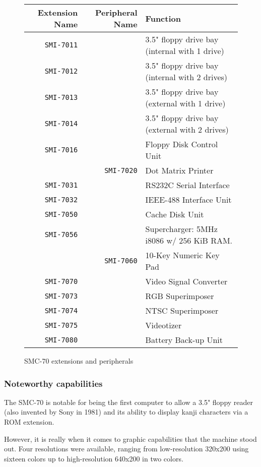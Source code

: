 \begin{figure}[H]

\begin{tabularx}{\textwidth}{rrX} 
  \toprule 
  \textbf{Extension Name} & \textbf{Peripheral Name} & \textbf{Function} \\               
  \toprule    
\texttt{SMI-7011} & & 3.5" floppy drive bay (internal with 1 drive)\\ 
\texttt{SMI-7012} & & 3.5" floppy drive bay (internal with 2 drives)\\ 
\texttt{SMI-7013} & & 3.5" floppy drive bay (external with 1 drive)\\ 
\texttt{SMI-7014} & & 3.5" floppy drive bay (external with 2 drives)\\ 
\texttt{SMI-7016} & & Floppy Disk Control Unit\\ 
 & \texttt{SMI-7020} & Dot Matrix Printer\\ 
\texttt{SMI-7031} & & RS232C Serial Interface\\ 
\texttt{SMI-7032} & & IEEE-488 Interface Unit\\ 
\texttt{SMI-7050} & & Cache Disk Unit\\ 
\texttt{SMI-7056} & & Supercharger: 5MHz i8086 w/ 256 KiB RAM.\\ 
 & \texttt{SMI-7060} & 10-Key Numeric Key Pad\\ 
\texttt{SMI-7070} & & Video Signal Converter\\ 
\texttt{SMI-7073} & & RGB Superimposer\\ 
\texttt{SMI-7074} & & NTSC Superimposer\\ 
\texttt{SMI-7075} & & Videotizer\\ 
\texttt{SMI-7080} & & Battery Back-up Unit\\ 
\toprule
\end{tabularx}%
\caption*{SMC-70 extensions and peripherals\cite{smc70tech}}
\end{figure}


\subsubsection{Noteworthy capabilities}
The SMC-70 is notable for being the first computer to allow a 3.5" floppy reader (also invented by Sony in 1981) and its ability to display kanji characters via a ROM extension. 

However, it is really when it comes to graphic capabilities that the machine stood out. Four resolutions were available, ranging from low-resolution 320x200 using sixteen colors up to high-resolution 640x200 in two colors. 

